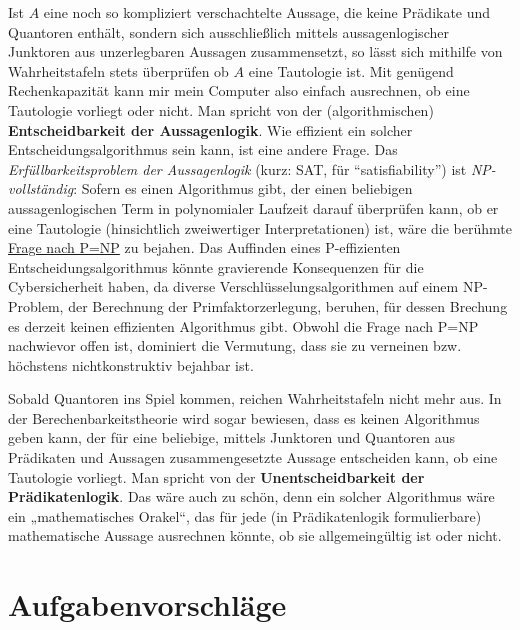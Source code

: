 \begin{vorschau} \label{entscheidbar}
    Ist $A$ eine noch so kompliziert verschachtelte Aussage, die keine Prädikate und Quantoren enthält, sondern sich ausschließlich mittels aussagenlogischer Junktoren aus unzerlegbaren Aussagen zusammensetzt, so lässt sich mithilfe von Wahrheitstafeln stets überprüfen ob $A$ eine Tautologie ist. Mit genügend Rechenkapazität kann mir mein Computer also einfach ausrechnen, ob eine Tautologie vorliegt oder nicht. Man spricht von der (algorithmischen) \textbf{Entscheidbarkeit der Aussagenlogik}. Wie effizient ein solcher Entscheidungsalgorithmus sein kann, ist eine andere Frage. Das \emph{Erfüllbarkeitsproblem der Aussagenlogik} (kurz: SAT, für ``satisfiability'') ist \emph{NP-vollständig}: Sofern es einen Algorithmus gibt, der einen beliebigen aussagenlogischen Term in polynomialer Laufzeit darauf überprüfen kann, ob er eine Tautologie (hinsichtlich zweiwertiger Interpretationen) ist, wäre die berühmte \href{https://de.wikipedia.org/wiki/P-NP-Problem}{Frage nach P=NP} zu bejahen. Das Auffinden eines P-effizienten Entscheidungsalgorithmus könnte gravierende Konsequenzen für die Cybersicherheit haben, da diverse Verschlüsselungsalgorithmen auf einem NP-Problem, der Berechnung der Primfaktorzerlegung, beruhen, für dessen Brechung es derzeit keinen effizienten Algorithmus gibt. Obwohl die Frage nach P=NP nachwievor offen ist, dominiert die Vermutung, dass sie zu verneinen bzw. höchstens nichtkonstruktiv bejahbar ist.

    Sobald Quantoren ins Spiel kommen, reichen Wahrheitstafeln nicht mehr aus. In der Berechenbarkeitstheorie wird sogar bewiesen, dass es keinen Algorithmus geben kann, der für eine beliebige, mittels Junktoren und Quantoren aus Prädikaten und Aussagen zusammengesetzte Aussage entscheiden kann, ob eine Tautologie vorliegt. Man spricht von der \textbf{Unentscheidbarkeit der Prädikatenlogik}. Das wäre auch zu schön, denn ein solcher Algorithmus wäre ein „mathematisches Orakel“, das für jede (in Prädikatenlogik formulierbare) mathematische Aussage ausrechnen könnte, ob sie allgemeingültig ist oder nicht.
\end{vorschau}





\clearpage
\section{Aufgabenvorschläge}


